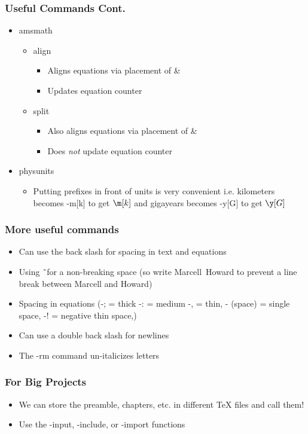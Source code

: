 \documentclass[fleqn, 11pt]{beamer}
\begin{document}
\begin{frame}
	\frametitle{Useful Commands Cont.}
	
	\begin{itemize}
		\item<1-> amsmath
		\begin{itemize}
			\item<2-> align
			\begin{itemize}
				\item<3-> Aligns equations via placement of \&
				\item<3-> Updates equation counter
			\end{itemize}
		\item<2-> split
		\begin{itemize}
			\item<4-> Also aligns equations via placement of \&
			\item<4-> Does \emph{not} update equation counter
		\end{itemize}
		\end{itemize}
	
	\item<1-> physunits
	\begin{itemize}
		\item<5-> Putting prefixes in front of units is very convenient i.e. kilometers becomes -m[k] to get $\m[k]$ and gigayears becomes -y[G] to get $\y[G]$
	\end{itemize}
	\end{itemize}
\end{frame}

\begin{frame}
	\frametitle{More useful commands}
	
	\begin{itemize}
		\item<1-> Can use the back slash for spacing in text and equations
		\item<2-> Using \~\ for a non-breaking space (so write Marcell~Howard to prevent a line break between Marcell and Howard)
		\item<3-> Spacing in equations (-; = thick -: = medium -, = thin, - (space) = single space, -! = negative thin space,)
		\item<4-> Can use a double back slash for newlines
		\item<5-> The -rm command un-italicizes letters
	\end{itemize}
\end{frame}

\begin{frame}
	\frametitle{For Big Projects}
	
	\begin{itemize}
		\item<1-> We can store the preamble, chapters, etc. in different TeX files and call them!
		\item<2-> Use the -input, -include, or -import functions
	\end{itemize}
\end{frame}
\end{document}
